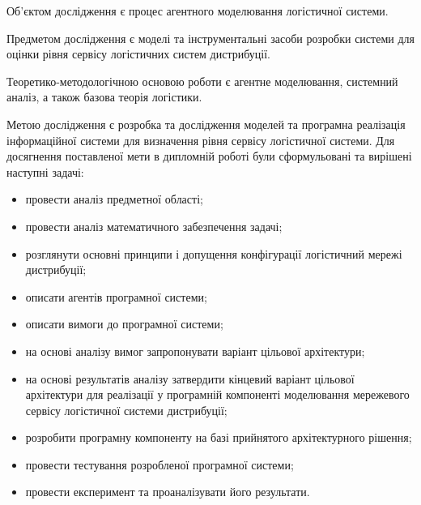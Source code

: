 Об'єктом дослідження є процес агентного моделювання логістичної системи. 

Предметом дослідження є моделі та інструментальні засоби розробки системи для оцінки рівня сервісу логістичних систем дистрибуції.

Теоретико-методологічною основою роботи є агентне моделювання, системний аналіз, а також базова теорія логістики.

Метою дослідження є розробка та дослідження моделей та програмна реалізація інформаційної системи для визначення рівня сервісу логістичної системи.
Для досягнення поставленої мети в дипломній роботі були сформульовані та вирішені наступні задачі:
\begin{itemize}
	\item провести аналіз предметної області;
	\item провести аналіз математичного забезпечення задачі;
	\item розглянути основні принципи і допущення конфігурації логістичний мережі дистрибуції;
	\item описати агентів програмної системи;
	\item описати вимоги до програмної системи;
	\item на основі аналізу вимог запропонувати варіант цільової архітектури;
	\item на основі результатів аналізу затвердити кінцевий варіант цільової архітектури для реалізації у програмній компоненті моделювання мережевого сервісу логістичної системи дистрибуції;
	\item розробити програмну компоненту на базі прийнятого архітектурного рішення;
	\item провести тестування розробленої програмної системи;
	\item провести експеримент та проаналізувати його результати.
\end{itemize}
